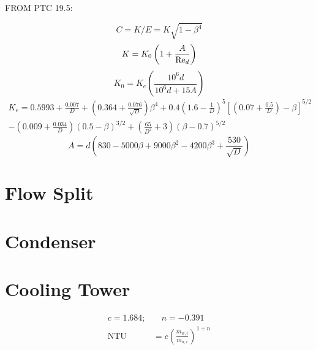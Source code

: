 
FROM PTC 19.5:

\begin{equation}
C = K/E = K\sqrt{1-\beta^4}
\end{equation}
\begin{equation}
K = K_0 \left(1+\frac{A}{\text{Re}_d}\right)
\end{equation}
\begin{equation}
K_0=K_e \left(\frac{10^6 d}{10^6 d + 15A}\right)
\end{equation}
\begin{multline}
K_e = 0.5993 + \frac{0.007}{D} + \left(0.364 + \frac{0.076}{\sqrt{D}}\right)\beta^4 
      + 0.4\left(1.6 - \frac{1}{D}\right)^5 \left[\left(0.07 + \frac{0.5}{D}\right) - \beta\right]^{5/2} \\
      - \left(0.009 + \frac{0.034}{D}\right) \left(0.5 - \beta\right)^{3/2} 
      + \left(\frac{65}{D^2} + 3\right)\left(\beta - 0.7\right)^{5/2}
\end{multline}
\begin{equation}
A = d\left(830 - 5000\beta + 9000\beta^2 - 4200\beta^3 + \frac{530}{\sqrt{D}}\right)
\end{equation}

\section{Flow Split} \label{sec:FlowSplit}

\section{Condenser} \label{sec:Condenser}

\section{Cooling Tower} \label{sec:CoolingTower}
\begin{align*}
  c = 1.684; &\quad n = - 0.391 \\
  \text{NTU} &= c\left(\frac{\dot{m}_{w,i}}{\dot{m}_{a,i}}\right)^{1 + n}
\end{align*}

